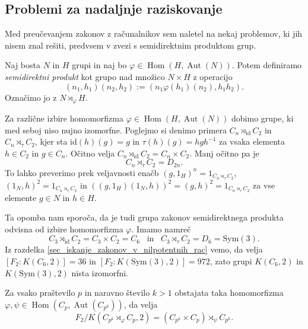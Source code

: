 \subsection{Problemi za nadaljnje raziskovanje}

Med preučevanjem zakonov z računalnikov sem naletel na nekaj problemov, ki jih nisem znal rešiti, predvsem v zvezi s semidirektnim produktom grup.
\begin{definicija}\label{def_semidirektni_produkt}
    Naj bosta $N$ in $H$ grupi in naj bo $\varphi \in \operatorname{Hom}(H, \operatorname{Aut}(N))$. Potem definiramo \emph{semidirektni produkt}
    kot grupo nad množico $N \times H$ z operacijo \begin{equation*}
        (n_1, h_1) (n_2, h_2) := (n_1 \varphi(h_1)(n_2), h_1 h_2 ).
    \end{equation*}
    Označimo jo z $N \rtimes_{\varphi} H$.
\end{definicija}
\begin{opomba}\label{opm_protiprimer_semidirektni}
    Za različne izbire homomorfizma $\varphi \in \operatorname{Hom}(H, \operatorname{Aut}(N))$ dobimo grupe, ki med seboj niso nujno izomorfne. Poglejmo si denimo primera $C_n \rtimes_{\text{id}} C_2$ in $C_n \rtimes_{\tau} C_2$, kjer sta $\text{id}(h)(g) = g$ in $\tau(h)(g) = h g h^{-1}$ za vsaka elementa $h \in C_2$ in $g \in C_n$. Očitno velja $C_n \rtimes_{\text{id}} C_2 = C_n \times C_2$. Manj očitno pa je \begin{equation*}
        C_n \rtimes_{\tau} C_2 = D_{2n}.
    \end{equation*}
    To lahko preverimo prek veljavnosti enačb $(g, 1_H)^n = 1_{C_n \rtimes_{\tau} C_2}$, $(1_N, h)^2 = 1_{C_n \rtimes_{\tau} C_2}$ in $((g, 1_H) (1_N, h))^2 = (g, h)^2 = 1_{C_n \rtimes_{\tau} C_2}$
    za vse elemente $g \in N$ in $h \in H$. 
\end{opomba}

Ta opomba nam sporoča, da je tudi grupa zakonov semidirektnega produkta odvisna od izbire homomorfizma $\varphi$.
Imamo namreč \begin{equation*}
    C_3 \rtimes_{\text{id}} C_2 = C_3 \times C_2 = C_6  \,\,\, \text{ in } \,\,\,  C_3 \rtimes_{\tau} C_2 = D_{6} = \text{Sym}(3). 
\end{equation*}
Iz razdelka \ref{sec_iskanje_zakonov_v_nilpotentnih_rac} vemo, da velja $[F_2 : K(C_6, 2)] = 36$ in $[F_2 : K(\text{Sym}(3), 2)] = 972$, zato grupi $K(C_6, 2)$ in $K(\text{Sym}(3), 2)$ nista izomorfni.

\begin{domneva}
    Za vsako praštevilo $p$ in naravno število $k > 1$ obstajata taka homomorfizma $\varphi, \psi \in \operatorname{Hom}(C_{p}, \operatorname{Aut}(C_{p^k}))$, da velja \begin{equation*}
        F_2 / K(C_{p^k} \rtimes_{\varphi} C_p, 2) = (C_{p^k} \times C_p) \rtimes_{\psi} C_{p^k}. 
    \end{equation*} 
\end{domneva}

